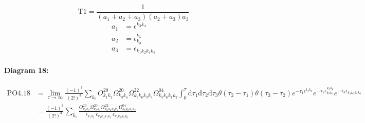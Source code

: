 \documentclass[10pt,a4paper]{article}
\begin{document}
\begin{equation}
\text{T}1 = \frac{1}{(a_1+ a_2+ a_3)(a_2+ a_3)a_3}\end{equation}
\begin{align*}
a_1 &= \epsilon^{k_{3}k_{4}}_{}\\
a_2 &= \epsilon^{k_{5}}_{k_{3}}\\
a_3 &= \epsilon^{}_{k_{1}k_{2}k_{4}k_{5}}
\end{align*}
\paragraph{Diagram 18:}
\begin{align}
\text{PO}4.18
&= \lim\limits_{\tau \to \infty}\frac{(-1)^3 }{(2!)^3}\sum_{k_i}O^{20}_{k_{1}k_{2}} \Omega^{20}_{k_{3}k_{4}} \Omega^{22}_{k_{5}k_{6}k_{3}k_{4}} \Omega^{04}_{k_{5}k_{6}k_{1}k_{2}} \int_{0}^{\tau}\mathrm{d}\tau_1\mathrm{d}\tau_2\mathrm{d}\tau_3\theta(\tau_2-\tau_1) \theta(\tau_3-\tau_2) e^{-\tau_1 \epsilon^{k_{3}k_{4}}_{}}e^{-\tau_2 \epsilon^{k_{5}k_{6}}_{k_{3}k_{4}}}e^{-\tau_3 \epsilon^{}_{k_{1}k_{2}k_{5}k_{6}}}
 \nonumber \\
&= \frac{(-1)^3 }{(2!)^3}\sum_{k_i}\frac{O^{20}_{k_{1}k_{2}} \Omega^{20}_{k_{3}k_{4}} \Omega^{22}_{k_{5}k_{6}k_{3}k_{4}} \Omega^{04}_{k_{5}k_{6}k_{1}k_{2}} }{\epsilon^{}_{k_{1}k_{2}}\ \epsilon^{}_{k_{3}k_{4}k_{1}k_{2}}\ \epsilon^{}_{k_{1}k_{2}k_{5}k_{6}}\ } 
\end{align}
\end{document}
